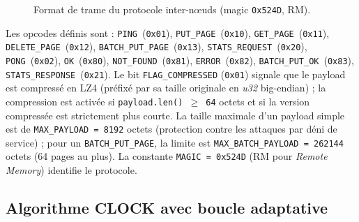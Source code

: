 \begin{figure}[H]
\centering
{}
\caption{Format de trame du protocole inter-nœuds (magic \texttt{0x524D}, \og{}RM\fg{}).}
\label{fig:trame}
\end{figure}

Les opcodes définis sont : \texttt{PING}~(\texttt{0x01}), \texttt{PUT\_PAGE}~(\texttt{0x10}), \texttt{GET\_PAGE}~(\texttt{0x11}), \texttt{DELETE\_PAGE}~(\texttt{0x12}), \texttt{BATCH\_PUT\_PAGE}~(\texttt{0x13}), \texttt{STATS\_REQUEST}~(\texttt{0x20}), \texttt{PONG}~(\texttt{0x02}), \texttt{OK}~(\texttt{0x80}), \texttt{NOT\_FOUND}~(\texttt{0x81}), \texttt{ERROR}~(\texttt{0x82}), \texttt{BATCH\_PUT\_OK}~(\texttt{0x83}), \texttt{STATS\_RESPONSE}~(\texttt{0x21}). Le bit \texttt{FLAG\_COMPRESSED} (\texttt{0x01}) signale que le payload est compressé en LZ4 (préfixé par sa taille originale en \emph{u32} big-endian) ; la compression est activée si \texttt{payload.len() \(\ge\) 64} octets et si la version compressée est strictement plus courte. La taille maximale d'un payload simple est de \texttt{MAX\_PAYLOAD = 8192} octets (protection contre les attaques par déni de service) ; pour un \texttt{BATCH\_PUT\_PAGE}, la limite est \texttt{MAX\_BATCH\_PAYLOAD = 262144} octets (64 pages au plus). La constante \texttt{MAGIC = 0x524D} (\og{}RM\fg{} pour \emph{Remote Memory}) identifie le protocole.

\subsection{Algorithme CLOCK avec boucle adaptative}

